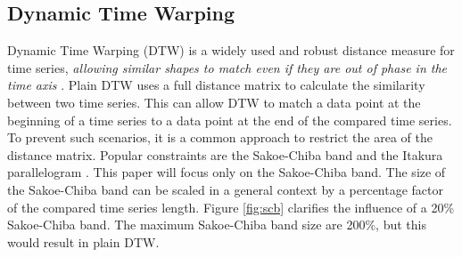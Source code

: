 \subsection{Dynamic Time Warping} \label{dynamic_time_warping}
Dynamic Time Warping (DTW) is a widely used and robust distance measure for time series, \textit{allowing similar shapes
to match even if they are out of phase in the time axis} \cite{keogh2002exact}. Plain DTW uses a full distance matrix to
calculate the similarity between two time series. This can allow DTW to match a data point at the beginning of a time series to a
data point at the end of the compared time series. To prevent such scenarios, it is a common approach to restrict the
area of the distance matrix. Popular constraints are the Sakoe-Chiba band \cite{sakoe1978dynamic} and the Itakura
parallelogram \cite{itakura1975minimum}. This paper will focus only on the Sakoe-Chiba band. The size of the Sakoe-Chiba
band can be scaled in a general context by a percentage factor of the compared time series
length. Figure \ref{fig:scb} clarifies the influence of a 20\% Sakoe-Chiba band. The maximum Sakoe-Chiba band size are
200\%, but this would result in plain DTW.

